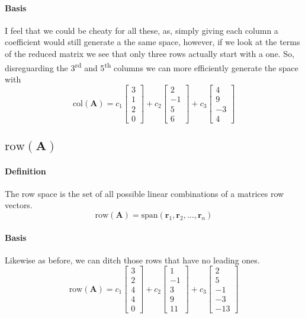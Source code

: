 \documentclass{article}
\begin{document}
            \paragraph{Basis}
                I feel that we could be cheaty for all these, as, simply giving each column a coefficient
                would still generate a the same space, however, if we look at the terms of the reduced matrix
                we see that only three rows actually start with a one. So, disreguarding the 3\textsuperscript{rd} and 5\textsuperscript{th}
                columns we can more efficiently generate the space with
                \[
                    \text{col}(\mathbf{A})=c_1\begin{bmatrix}3\\1\\2\\0\end{bmatrix}+c_2\begin{bmatrix}2\\-1\\5\\6\end{bmatrix}+c_3\begin{bmatrix}4\\9\\-3\\4\end{bmatrix}
                \]
        \subsection[The row space of A]{$\text{row}(\mathbf{A})$}
            \paragraph{Definition}
                The row space is the set of all possible linear combinations of a matrices row vectors.
                \[
                    \text{row}(\mathbf{A})=\text{span}(\mathbf{r}_1,\mathbf{r}_2,\dots,\mathbf{r}_n)
                \]
            \paragraph{Basis}
                Likewise as before, we can ditch those rows that have no leading ones.
                \[
                    \text{row}(\mathbf{A})=c_1\begin{bmatrix}3\\2\\4\\4\\0\end{bmatrix}+c_2\begin{bmatrix}1\\-1\\3\\9\\11\end{bmatrix}+c_3\begin{bmatrix}2\\5\\-1\\-3\\-13\end{bmatrix}
                \]
\end{document}
